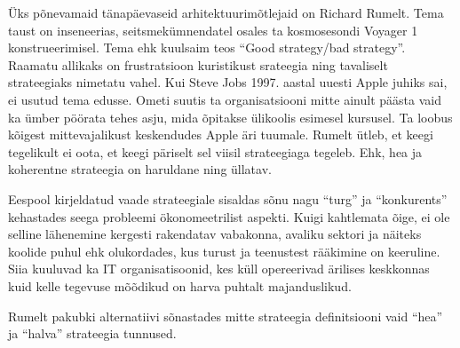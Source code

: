 \documentclass{tufte-book}
\begin{document}
Üks põnevamaid tänapäevaseid arhitektuurimõtlejaid on Richard Rumelt. Tema taust on inseneerias, seitsmekümnendatel osales ta kosmosesondi Voyager 1 konstrueerimisel. Tema ehk kuulsaim teos \enquote{Good strategy/bad strategy}\cite{rumelt2011good}. Raamatu allikaks on frustratsioon kuristikust srateegia ning tavaliselt strateegiaks nimetatu vahel. Kui Steve Jobs 1997. aastal uuesti Apple juhiks sai, ei usutud tema edusse. Ometi suutis ta organisatsiooni mitte ainult päästa vaid ka ümber pöörata tehes asju, mida õpitakse ülikoolis esimesel kursusel. Ta loobus kõigest mittevajalikust keskendudes Apple äri tuumale. Rumelt ütleb, et keegi tegelikult ei oota, et keegi päriselt sel viisil strateegiaga tegeleb. Ehk, hea ja koherentne strateegia on haruldane ning üllatav.

Eespool kirjeldatud vaade strateegiale sisaldas sõnu nagu \enquote{turg} ja \enquote{konkurents} kehastades seega probleemi ökonomeetrilist aspekti. Kuigi kahtlemata õige, ei ole selline lähenemine kergesti rakendatav vabakonna, avaliku sektori ja näiteks koolide puhul ehk olukordades, kus turust ja teenustest rääkimine on keeruline. Siia kuuluvad ka IT organisatisoonid, kes küll opereerivad ärilises keskkonnas kuid kelle tegevuse mõõdikud on harva puhtalt majanduslikud.

Rumelt pakubki alternatiivi sõnastades mitte strateegia definitsiooni vaid \enquote{hea} ja \enquote{halva} strateegia tunnused. 
\end{document}
